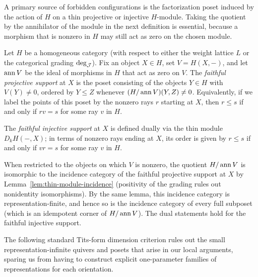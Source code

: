 A primary source of forbidden configurations is the factorization poset induced by the action of $H$ on a thin projective or injective $H$-module. Taking the quotient by the annihilator of the module in the next definition is essential, because a morphism that is nonzero in $H$ may still act as zero on the chosen module.

\begin{definition}
\label{def:faithful-support}
Let $H$ be a homogeneous category (with respect to either the weight lattice $L$ or the categorical grading $\deg_\mathcal J$). Fix an object $X\in H$, set $V=H(X,-)$, and let $\operatorname{ann} V$ be the ideal of morphisms in $H$ that act as zero on $V$. The \emph{faithful projective support} at $X$ is the poset consisting of the objects $Y\in H$ with $V(Y)\ne0$, ordered by $Y\leq Z$ whenever $(H/\operatorname{ann} V)(Y,Z)\ne0$. Equivalently, if we label the points of this poset by the nonzero rays $r$ starting at $X$, then $r\leq s$ if and only if $rv=s$ for some ray $v$ in $H$.

The \emph{faithful injective support} at $X$ is defined dually via the thin module $D_k H(-,X)$; in terms of nonzero rays ending at $X$, its order is given by $r\leq s$ if and only if $vr=s$ for some ray $v$ in $H$.
\end{definition}

When restricted to the objects on which $V$ is nonzero, the quotient $H/\operatorname{ann} V$ is isomorphic to the incidence category of the faithful projective support at $X$ by Lemma~\ref{lem:thin-module-incidence} (positivity of the grading rules out nonidentity isomorphisms). By the same lemma, this incidence category is representation-finite, and hence so is the incidence category of every full subposet (which is an idempotent corner of $H/\operatorname{ann} V$). The dual statements hold for the faithful injective support.

The following standard Tits-form dimension criterion rules out the small representation-infinite quivers and posets that arise in our local arguments, sparing us from having to construct explicit one-parameter families of representations for each orientation.

